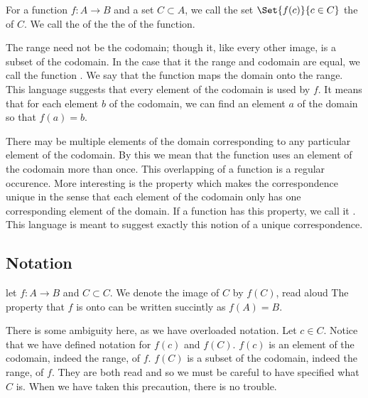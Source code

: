 For a function $f: A \to B$ and a set $C \subset A$, we call the set $\Set{f(c)}{c \in C}$ the  of $C$.
We call the  of the  the  of the function.

The range need not be the codomain; though it, like every other image, is a subset of the codomain.
In the case that it the range and codomain are equal, we call the function .
We say that the function maps the domain onto the range.
This language suggests that every element of the codomain is used by $f$.
It means that for each element $b$ of the codomain, we can find an element $a$ of the domain so that $f(a) = b$.

There may be multiple elements of the domain corresponding to any particular element of the codomain.
By this we mean that the function uses an element of the codomain more than once.
This overlapping of a function is a regular occurence.
More interesting is the property which makes the correspondence unique in the sense that each element of the codomain only has one corresponding element of the domain.
If a function has this property, we call it .
This language is meant to suggest exactly this notion of a unique correspondence.

\subsection{Notation}

let $f: A \to B$ and $C \subset C$.
We denote the image of $C$ by $f(C)$, read aloud 
The property that $f$ is onto can be written succintly as $f(A) = B$.

There is some ambiguity here, as we have overloaded notation.
Let $c \in C$.
Notice that we have defined notation for $f(c)$ and $f(C)$.
$f(c)$ is an element of the codomain, indeed the range, of $f$.
$f(C)$ is a subset of the codomain, indeed the range, of $f$.
They are both read  and so we must be careful to have specified what $C$ is.
When we have taken this precaution, there is no trouble.


